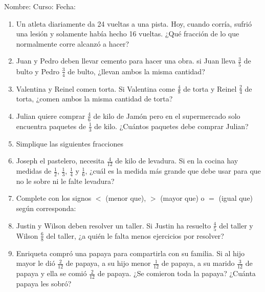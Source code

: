 \documentclass[letterpaper,fleqn]{article}
\newcommand{\LineaNombre}{%
\par
\vspace{\baselineskip}
Nombre:\hrulefill \; Curso: \underline{\hspace*{48pt}} \; Fecha: \underline{\hspace*{2.5cm}} \relax
\par}
\begin{document}
\LineaNombre
\begin{enumerate}
 \item Un atleta diariamente da 24 vueltas a una pista. Hoy, cuando corría, sufrió una lesión y solamente había hecho 16 vueltas. ¿Qué  fracción de lo que normalmente corre alcanzó a hacer? \noanswer
\item Juan y Pedro deben llevar cemento para hacer una obra. si Juan lleva $\frac{3}{5}$ de bulto y Pedro $\frac{3}{4}$ de bulto, ¿llevan ambos la misma cantidad?\noanswer
\item Valentina y Reinel comen torta. Si Valentina come $\frac{4}{8}$ de torta y Reinel $\frac{2}{4}$ de torta, ¿comen ambos la misma cantidad de torta?\noanswer
\item Julian quiere comprar $\frac{4}{6}$ de kilo de Jamón pero en el supermercado solo encuentra  paquetes de $\frac{1}{3}$ de kilo. ¿Cuántos paquetes debe comprar Julian?\noanswer
\newpage
\item Simplique las siguientes fracciones
\begin{enumerate}
\end{enumerate}
\item Joseph el pastelero, necesita $\frac{4}{12}$ de kilo de levadura. Si en la cocina hay medidas de $\frac{1}{2}$, $\frac{1}{3}$, $\frac{1}{4}$ y $\frac{1}{6}$, ¿cu\'{a}l es la medida m\'{a}s grande que debe usar para que no le sobre ni le falte levadura?\noanswer
\item Complete con los signos $<$ (menor que), $>$ (mayor que) o $=$ (igual que) según corresponda:
\begin{enumerate}
\end{enumerate}
\item Justin y Wilson deben resolver un taller. Si Justin ha resuelto $\frac{4}{5}$ del taller y Wilson $\frac{6}{8}$ del taller, ¿a quién le falta menos ejercicios por resolver?\noanswer
\item Enriqueta compró una papaya para compartirla con su familia. Si al hijo mayor le dió $\frac{2}{12} $ de papaya, a su hijo menor $\frac{1}{12}$ de papaya, a su marido $\frac{3}{12}$ de papaya y ella se comió $\frac{2}{12}$ de papaya. ¿Se comieron toda la papaya? ¿Cuánta papaya les sobró?\noanswer
 \end{enumerate}
\end{document}
